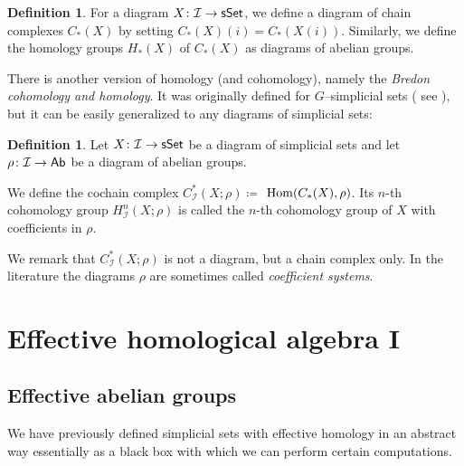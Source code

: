 \documentclass[12pt,a4wide]{article}
\theoremstyle{plain}
\theoremstyle{definition}
\newtheorem{Def}[thm]{Definition}
\newcommand{\OgsSet}{[{\mathcal{O}_G ^\mathsf{op}},{\mathsf{sSet}}]}
\renewcommand\:{\colon}
\newcommand{\dX}{X}
\newcommand{\drho}{\rho}
\newcommand{\dC}{{C}}
\newcommand{\dH}{H}
\newcommand{\icat}{\mathcal I}
\begin{document}
\begin{Def}
For a diagram $\dX\: \icat \to \sSet$, we define a diagram of chain complexes $\dC_*(\dX)$ by setting $\dC_*(\dX)(i) = C_*(\dX(i))$. Similarly, we define the homology groups $\dH_* (\dX)$ of $\dC_*(\dX)$ as diagrams of abelian groups.
\end{Def}
There is another version of homology (and cohomology), namely the \emph{Bredon cohomology and homology}. It was originally defined for $G$--simplicial sets (
see \cite{bredon}), but it can be easily generalized to any diagrams of simplicial sets:
\begin{Def}\label{def:Bredon}
Let $\dX \colon \icat \to \sSet$ be a diagram of simplicial sets and let $\drho\colon \icat \to \Ab$ be a diagram of abelian groups. 

We define the cochain complex $C^* _\icat (\dX;\drho) \coloneqq$ $\Hom(\dC_*( \dX), \drho)$. Its $n$-th cohomology group $H^n _\icat (\dX; \drho)$ is called the $n$-th cohomology group of $\dX$ with coefficients in $\drho$.
\end{Def}
We remark that $C^* _\icat(\dX;\drho)$ is not a diagram, but a chain complex only. In the literature \cite{alaska, bredon} the diagrams $\drho$ are sometimes called \emph{coefficient systems}.

\section{Effective homological algebra I}\label{sec:effective_first}
\subsection{Effective abelian groups}\label{sec:effabgrp}
We have previously defined simplicial sets with effective homology in an abstract way essentially as a black box with which we can perform certain computations.
\end{document}
